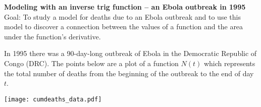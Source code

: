 \documentclass[letterpaper,11pt]{article}
\begin{document}
\pagestyle{fancy}

{\large \textbf{Modeling with an inverse trig function -- an Ebola outbreak in 1995}} \\
Goal: To study a model for deaths due to an Ebola outbreak and to use this model to discover a connection between the values of a function and the area under the function's derivative.

\smallskip

In 1995 there was a 90-day-long outbreak of Ebola in the Democratic Republic of Congo (DRC). The points below are a plot of a function $N(t)$ which represents the total number of deaths from the beginning of the outbreak to the end of day $t$. 

\texttt{[image: cumdeaths\_data.pdf]}
\end{document}
